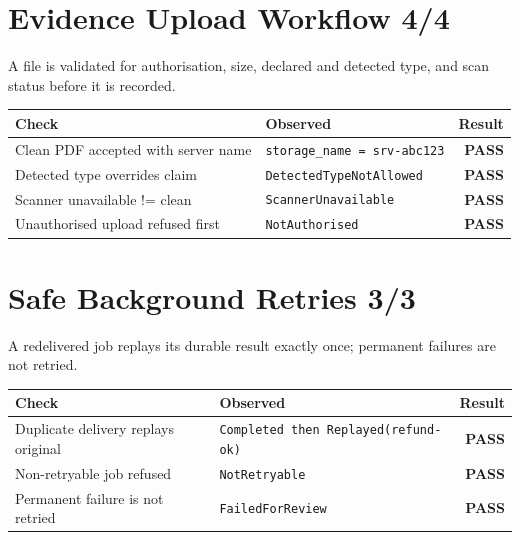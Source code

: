 \documentclass[11pt,a4paper]{article}
\newcommand{\pass}{\textcolor{PassGreen}{\textbf{PASS}}}
\begin{document}
\section*{Evidence Upload Workflow \hfill \normalsize\textcolor{ADGBlue}{4/4}}
\noindent A file is validated for authorisation, size, declared and detected type, and scan status before it is recorded.\par\vspace{0.4em}
\renewcommand{\arraystretch}{1.25}
\begin{longtable}{@{}p{}p{}r@{}}
\toprule
\textbf{Check} & \textbf{Observed} & \textbf{Result} \\
\midrule
\endhead
Clean PDF accepted with server name & \texttt{\small storage\_name = srv-abc123} & \pass \\
Detected type overrides claim & \texttt{\small DetectedTypeNotAllowed} & \pass \\
Scanner unavailable != clean & \texttt{\small ScannerUnavailable} & \pass \\
Unauthorised upload refused first & \texttt{\small NotAuthorised} & \pass \\
\bottomrule
\end{longtable}

\section*{Safe Background Retries \hfill \normalsize\textcolor{ADGBlue}{3/3}}
\noindent A redelivered job replays its durable result exactly once; permanent failures are not retried.\par\vspace{0.4em}
\renewcommand{\arraystretch}{1.25}
\begin{longtable}{@{}p{}p{}r@{}}
\toprule
\textbf{Check} & \textbf{Observed} & \textbf{Result} \\
\midrule
\endhead
Duplicate delivery replays original & \texttt{\small Completed then Replayed(refund-ok)} & \pass \\
Non-retryable job refused & \texttt{\small NotRetryable} & \pass \\
Permanent failure is not retried & \texttt{\small FailedForReview} & \pass \\
\bottomrule
\end{longtable}
\end{document}
